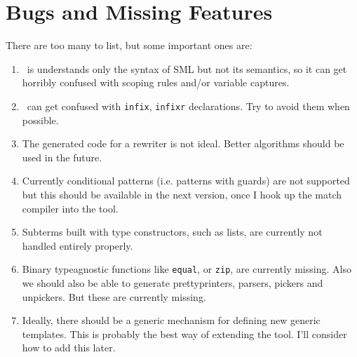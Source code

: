 \section{Bugs and Missing Features}
    There are too many to list, but some important ones are:
  \begin{enumerate}
  \item
   \RewriteGen\ is understands only the syntax of SML but not its semantics,
so it can get horribly confused with scoping rules and/or variable captures.

   \item \RewriteGen\ can get confused with \verb|infix|, \verb|infixr|
        declarations.  Try to avoid them when possible.
  \item
    The generated code for a rewriter is not ideal.  Better algorithms
    should be used in the future.

  \item
   Currently conditional patterns (i.e. patterns with guards) 
are not supported but this should be available in the next version, 
once I hook up the match compiler into the tool.

  \item
   Subterms built with type constructors, such as lists, are currently not
handled entirely properly.  

  \item
   Binary typeagnostic functions like \verb|equal|, or \verb|zip|, are currently
missing.  Also we should also be able to generate prettyprinters, 
parsers,  pickers and unpickers.  But these are currently missing. 

  \item
   Ideally, there should be a generic mechanism for defining new 
generic templates.  This is probably the best way of extending the
tool.   I'll consider how to add this later.
\end{enumerate}


